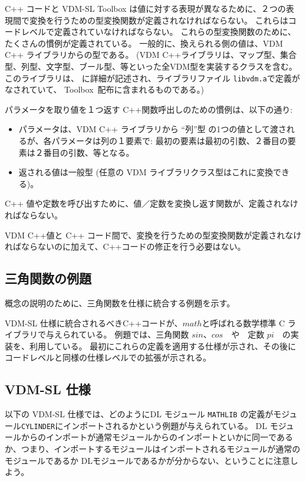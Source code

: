 \documentclass[\pformat,12pt]{jarticle}
\newcommand{\Toolbox}{Toolbox}
\begin{document}
 C++ コードと VDM-SL Toolbox は値に対する表現が異なるために、２つの表現間で変換を行うための型変換関数が定義されなければならない。
これらはコードレベルで定義されていなければならない。
これらの型変換関数のために、たくさんの慣例が定義されている。 
一般的に、換えられる側の値は、VDM C++ ライブラリからの型である。
(VDM C++ライブラリは、マップ型、集合型、列型、文字型、ブール型、等といった全VDM型を実装するクラスを含む。
このライブラリは、 \cite{LibMan-SCSK}に詳細が記述され、ライブラリファイル {\tt libvdm.a}で定義がなされていて、 \Toolbox\ 配布に含まれるものである。)

パラメータを取り値を１つ返す C++関数呼出しのための慣例は、以下の通り:
\begin{itemize}
\item パラメータは、VDM C++ ライブラリから ``列''型 の1つの値として渡されるが、各パラメータは列の１要素で: 最初の要素は最初の引数、２番目の要素は２番目の引数、等となる。
\item 返される値は一般型 (任意の VDM ライブラリクラス型はこれに変換できる)。
\end{itemize}

 C++ 値や定数を呼び出すために、値／定数を変換し返す関数が、定義されなければならない。

VDM C++値と C++ コード間で、変換を行うための型変換関数が定義されなければならないのに加えて、C++コードの修正を行う必要はない。

 
\subsection{三角関数の例題}

概念の説明のために、三角関数を仕様に統合する例題を示す。

 VDM-SL 仕様に統合されるべきC++コードが、$math$と呼ばれる数学標準 C ライブラリで与えられている。
例題では、三角関数 $sin$、$cos$　や　定数 $pi$　の実装を、利用している。
最初にこれらの定義を適用する仕様が示され、その後にコードレベルと同様の仕様レベルでの拡張が示される。

\subsection*{VDM-SL 仕様}

以下の VDM-SL 仕様では、どのようにDL モジュール {\tt MATHLIB} の定義がモジュール{\tt CYLINDER}にインポートされるかという例題が与えられている。
DL モジュールからのインポートが通常モジュールからのインポートといかに同一であるか、つまり、インポートするモジュールはインポートされるモジュールが通常のモジュールであるか DLモジュールであるかが分からない、ということに注意しよう。
\end{document}
